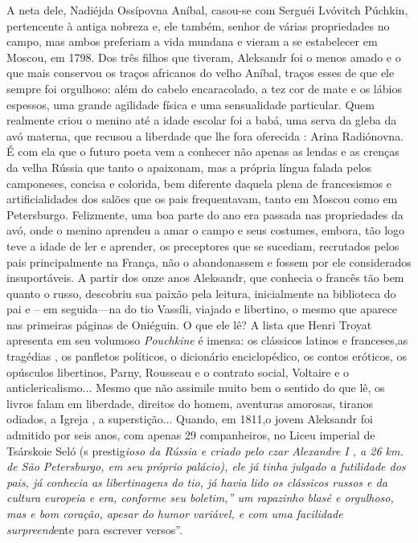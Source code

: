 A neta dele, Nadiéjda Ossípovna Aníbal, casou-se com Serguéi Lvóvitch
Púchkin, pertencente à antiga nobreza e, ele também, senhor de várias
propriedades no campo, mas ambos preferiam a vida mundana e vieram a se
estabelecer em Moscou, em 1798. Dos três filhos que tiveram, Aleksandr
foi o menos amado e o que mais conservou os traços africanos do velho
Aníbal, traços esses de que ele sempre foi orgulhoso: além do cabelo
encaracolado, a tez cor de mate e os lábios espessos, uma grande
agilidade física e uma sensualidade particular. Quem realmente criou o
menino até a idade escolar foi a babá, uma serva da gleba da avó
materna, que recusou a liberdade que lhe fora oferecida : Arina
Radiónovna. É com ela que o futuro poeta vem a conhecer não apenas as
lendas e as crenças da velha Rússia que tanto o apaixonam, mas a própria
língua falada pelos camponeses, concisa e colorida, bem diferente
daquela plena de francesismos e artificialidades dos salões que os pais
frequentavam, tanto em Moscou como em Petersburgo. Felizmente, uma boa
parte do ano era passada nas propriedades da avó, onde o menino aprendeu
a amar o campo e seus costumes, embora, tão logo teve a idade de ler e
aprender, os preceptores que se sucediam, recrutados pelos pais
principalmente na França, não o abandonassem e fossem por ele
considerados insuportáveis. A partir dos onze anos Aleksandr, que
conhecia o francês tão bem quanto o russo, descobriu sua paixão pela
leitura, inicialmente na biblioteca do pai e -- em seguida---na do tio
Vassíli, viajado e libertino, o mesmo que aparece nas primeiras páginas
de Oniéguin. O que ele lê? A lista que Henri Troyat apresenta em seu
volumoso \emph{Pouchkine} é imensa: os clássicos latinos e franceses,as
tragédias , os panfletos políticos, o dicionário enciclopédico, os
contos eróticos, os opúsculos libertinos, Parny, Rousseau e o contrato
social, Voltaire e o anticlericalismo... Mesmo que não assimile muito
bem o sentido do que lê, os livros falam em liberdade, direitos do
homem, aventuras amorosas, tiranos odiados, a Igreja , a superstição...
Quando, em 1811,o jovem Aleksandr foi admitido por seis anos, com apenas
29 companheiros, no Liceu imperial de Tsárskoie Seló (s
prestig\emph{ioso da Rússia e criado pelo czar Alexandre I , a 26 km. de São
Petersburgo, em seu próprio palácio), ele já tinha julgado a futilidade
dos pais, já conhecia as libertinagens do tio, já havia lido os
clássicos russos e da cultura europeia e era, conforme seu boletim,'' um
rapazinho \emph{blasé} e orgulhoso, mas e bom coração, apesar do humor
variável, e com uma facilidade surpreend}ente para escrever versos''.
